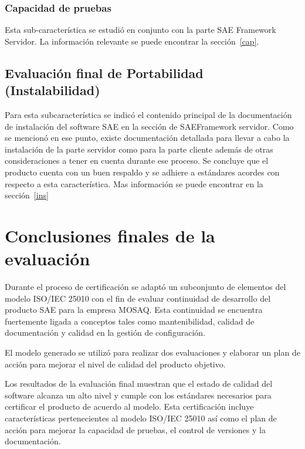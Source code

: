 \subsubsection{Capacidad de pruebas}

Esta sub-característica se estudió en conjunto con la parte SAE Framework 
Servidor. La información relevante se puede encontrar la sección~\ref{cap}.

\subsection{Evaluación final de Portabilidad (Instalabilidad)}

Para esta subcaracterística se indicó el contenido principal de la documentación de instalación
del software SAE en la sección de SAEFramework servidor. Como se mencionó en ese punto, existe
documentación detallada para llevar a cabo la instalación de la parte 
servidor como para la parte cliente además de otras consideraciones a tener en cuenta durante ese proceso.
Se concluye que el producto cuenta con un buen respaldo y se adhiere 
a estándares acordes con respecto a esta característica. Mas información se puede encontrar en la sección~\ref{ins}

\section{Conclusiones finales de la evaluación}
Durante el proceso de certificación se adaptó un subconjunto de
elementos del modelo ISO/IEC 25010 con el fin de evaluar continuidad de 
desarrollo del producto SAE para la empresa MOSAQ.
Esta continuidad se encuentra fuertemente ligada a conceptos tales como 
mantenibilidad, calidad de documentación y calidad en la gestión de configuración.

El modelo generado se utilizó para realizar dos evaluaciones y elaborar un plan de acción para mejorar el nivel de calidad del producto objetivo.

Los resultados de la evaluación final muestran que el estado de calidad del 
software alcanza un alto nivel y cumple con los estándares necesarios para 
certificar el producto de acuerdo al modelo. Esta certificación incluye 
características pertenecientes al modelo ISO/IEC 25010 así como el plan de 
acción para mejorar la capacidad de pruebas, el control de versiones y la documentación.
